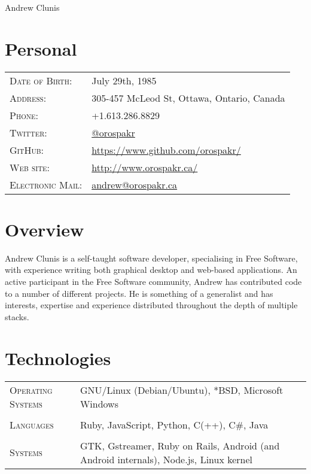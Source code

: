 \documentclass[letterpaper,10pt]{article}
\begin{document}
\pagestyle{empty} %

\par{\centering
{\Huge Andrew \textsc Clunis
}\bigskip\par}

\section{Personal}
\begin{longtable}{p{3cm}|p{12cm}}
  \textsc{Date of Birth:} & July 29th, 1985 \\
  \textsc{Address:} & 305-457 McLeod St, Ottawa, Ontario, Canada \\
  \textsc{Phone:} & +1.613.286.8829 \\
  \textsc{Twitter:} & \href{http://twitter.com/orospakr/}{@orospakr} \\
  \textsc{GitHub:} & \href{https://github.com/orospakr/}{https://www.github.com/orospakr/} \\
  \textsc{Web site:} & \href{http://www.orospakr.ca}{http://www.orospakr.ca/} \\
  \textsc{Electronic Mail:} & \href{mailto:andrew@orospakr.ca}{andrew@orospakr.ca} \\
\end{longtable}

\section{Overview}
Andrew Clunis is a self-taught software developer, specialising in Free Software, with experience writing both graphical desktop and web-based applications.  An active participant in the Free Software community, Andrew has contributed code to a number of different projects.  He is something of a generalist and has interests, expertise and experience distributed throughout the depth of multiple stacks.

\section{Technologies}
\begin{longtable}{p{3cm}|p{12cm}}
  \textsc{Operating Systems} & GNU/Linux (Debian/Ubuntu), *BSD, Microsoft Windows\\
  \multicolumn{2}{c}{} \\
  \textsc{Languages} & Ruby, JavaScript, Python, C(++), C\#, Java \\
  \multicolumn{2}{c}{} \\
  \textsc{Systems} & GTK, Gstreamer, Ruby on Rails, Android (and Android internals), Node.js, Linux kernel
\end{longtable}
\end{document}
